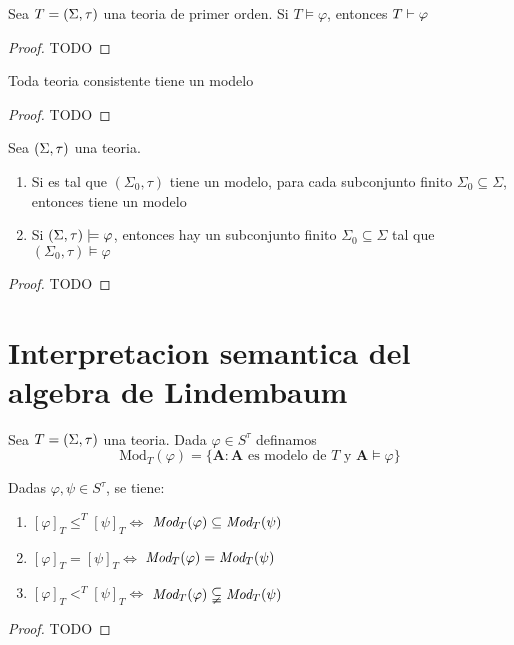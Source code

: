 \begin{theorem}
  Sea $T=(\Sigma,\tau)$ una teoria de primer orden. Si $T\models\varphi$, entonces $T\vdash\varphi$
\end{theorem}
\begin{proof}
  TODO
\end{proof}
\begin{corollary}
  Toda teoria consistente tiene un modelo
\end{corollary}
\begin{proof}
  TODO
\end{proof}
\begin{corollary}
  Sea $(\Sigma,\tau)$ una teoria. \begin{enumerate}
    \item Si \forder es tal que $(\Sigma_0,\tau)$ tiene un modelo, para cada subconjunto finito $\Sigma_0\subseteq\Sigma$, entonces \forder tiene un modelo
    \item Si $(\Sigma,\tau)\models\varphi$, entonces hay un subconjunto finito $\Sigma_0\subseteq\Sigma$ tal que $(\Sigma_0,\tau)\models\varphi$
  \end{enumerate}
\end{corollary}
\begin{proof}
  TODO
\end{proof}

\section{Interpretacion semantica del algebra de Lindembaum}
\begin{definition}
  Sea $T=(\Sigma,\tau)$ una teoria. Dada $\varphi\in S^\tau$ definamos
  $$
  \text{Mod}_T(\varphi)=\{\mathbf{A}:\mathbf{A} \text{ es modelo de } T \text{ y } \mathbf{A}\models\varphi\}
  $$
\end{definition}

\begin{lemma}
  Dadas $\varphi,\psi \in S^\tau$, se tiene:\begin{enumerate}
    \item $[\varphi]_T\leq^T[\psi]_T\iff$ $\emph{Mod}_T(\varphi)\subseteq\emph{Mod}_T(\psi)$
    \item $[\varphi]_T=[\psi]_T\iff$ $\emph{Mod}_T(\varphi)=\emph{Mod}_T(\psi)$
    \item $[\varphi]_T<^T[\psi]_T\iff$ $\emph{Mod}_T(\varphi)\subsetneqq\emph{Mod}_T(\psi)$
  \end{enumerate}
\end{lemma}
\begin{proof}
  TODO
\end{proof}